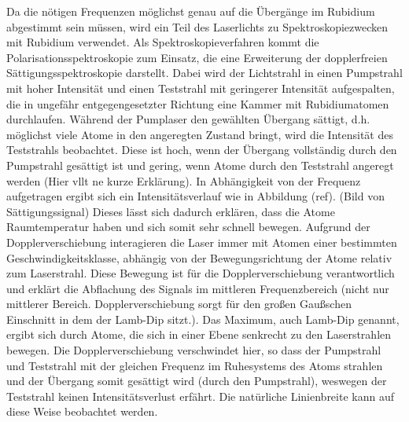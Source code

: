 \documentclass[11pt, a4paper]{article}
\numberwithin{equation}{section}
\newcommand{\korr}[1]{{\color{red}(#1)}}
\begin{document}
Da die nötigen Frequenzen möglichst genau auf die Übergänge im Rubidium abgestimmt sein müssen, wird ein Teil des Laserlichts zu Spektroskopiezwecken mit Rubidium verwendet.
Als Spektroskopieverfahren kommt die Polarisationsspektroskopie zum Einsatz, die eine Erweiterung der dopplerfreien Sättigungsspektroskopie darstellt.
Dabei wird der Lichtstrahl in einen Pumpstrahl mit hoher Intensität und einen Teststrahl mit geringerer Intensität aufgespalten, die in ungefähr entgegengesetzter Richtung eine Kammer mit Rubidiumatomen durchlaufen.
Während der Pumplaser den gewählten Übergang sättigt, d.h. möglichst viele Atome in den angeregten Zustand bringt, wird die Intensität des Teststrahls beobachtet.
Diese ist hoch, wenn der Übergang vollständig durch den Pumpstrahl gesättigt ist und gering, wenn Atome durch den Teststrahl angeregt werden \korr{Hier vllt ne kurze Erklärung}.
In Abhängigkeit von der Frequenz aufgetragen ergibt sich ein Intensitätsverlauf wie in Abbildung \korr{ref}.
\korr{Bild von Sättigungssignal}
Dieses lässt sich dadurch erklären, dass die Atome Raumtemperatur haben und sich somit sehr schnell bewegen.
Aufgrund der Dopplerverschiebung interagieren die Laser immer mit Atomen einer bestimmten Geschwindigkeitsklasse, abhängig von der Bewegungsrichtung der Atome relativ zum Laserstrahl.
Diese Bewegung ist für die Dopplerverschiebung verantwortlich und erklärt die Abflachung des Signals im mittleren Frequenzbereich \korr{nicht nur mittlerer Bereich. Dopplerverschiebung sorgt für den großen Gaußschen Einschnitt in dem der Lamb-Dip sitzt.}.
Das Maximum, auch Lamb-Dip genannt, ergibt sich durch Atome, die sich in einer Ebene senkrecht zu den Laserstrahlen bewegen.
Die Dopplerverschiebung verschwindet hier, so dass der Pumpstrahl und Teststrahl mit der gleichen Frequenz im Ruhesystems des Atoms strahlen und der Übergang somit gesättigt wird \korr{durch den Pumpstrahl}, weswegen der Teststrahl keinen Intensitätsverlust erfährt.
Die natürliche Linienbreite kann auf diese Weise beobachtet werden.
\end{document}
